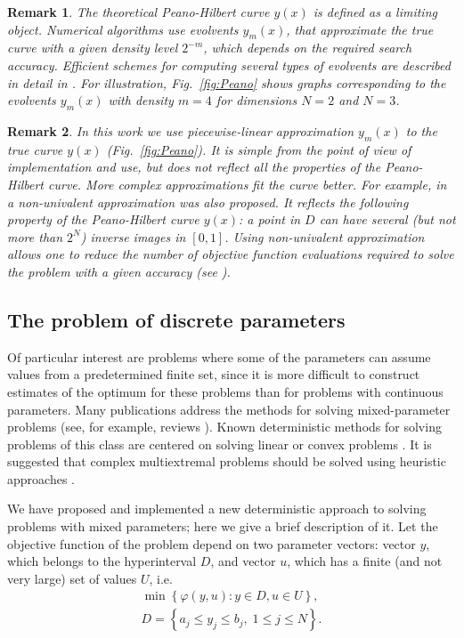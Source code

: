 \documentclass[iicol]{sn-jnl}
\theoremstyle{thmstyleone}%
\theoremstyle{thmstyletwo}%
\newtheorem{remark}{Remark}%
\theoremstyle{thmstylethree}%
\begin{document}
\begin{remark}
The theoretical Peano-Hilbert curve $y(x)$ is defined as a limiting object. Numerical algorithms use evolvents $y_m(x)$, that approximate the true curve with a given density level $2^{-m}$, which depends on the required search accuracy. Efficient schemes for computing several types of evolvents are described in detail in \citet{Sergeyev2013}. For illustration, Fig.~\ref{fig:Peano} shows graphs corresponding to the evolvents $y_m(x)$ with density $m=4$ for dimensions $N=2$ and $N=3$.
\end{remark}

\textcolor[rgb]{0,0,1}{
\begin{remark}
In this work we use piecewise-linear approximation $y_m(x)$ to the true curve $y(x)$ (Fig.~\ref{fig:Peano}). It is simple from the point of view of implementation and use, but does not reflect all the properties of the Peano-Hilbert curve. More complex approximations fit the curve better. For example, in \cite{Strongin2000} a non-univalent approximation was also proposed. It reflects the following property of the Peano-Hilbert curve $y(x)$: a point in $D$ can have several (but not more than $2^N$) inverse images in $[0,1]$. Using non-univalent approximation allows one to reduce the number of objective function evaluations required to solve the problem with a given accuracy (see \cite{Sergeyev2022, Lera2024}).
\end{remark}}

\subsection{The problem of discrete parameters}\label{sec_discr} 

Of particular interest are problems where some of the parameters can assume values from a predetermined finite set, since it is more difficult to construct estimates of the optimum for these problems than for problems with continuous parameters. Many publications address the methods for solving mixed-parameter problems (see, for example, reviews \citet{Burer2012,Boukouvala2016}). Known deterministic methods for solving problems of this class are centered on solving linear or convex problems \citep{Lee2012}. It is suggested that complex multiextremal problems should be solved using heuristic approaches \citep{Belotti2013}. 

We have proposed and implemented a new deterministic approach to solving problems with mixed parameters; here we give a brief description of it. 
Let the objective function of the problem depend on two parameter vectors: vector $y$, which belongs to the hyperinterval $D$, and vector $u$, which has a finite (and not very large) set of values $U$, i.e.
\begin{gather}\label{problem_i}
\min{\left\{ \varphi(y,u) : y\in D, u \in U \right\}},\\
D=\left\{a_j \leq y_j \leq b_j, \; 1\leq j \leq N \right\}.\nonumber
\end{gather}
\end{document}
